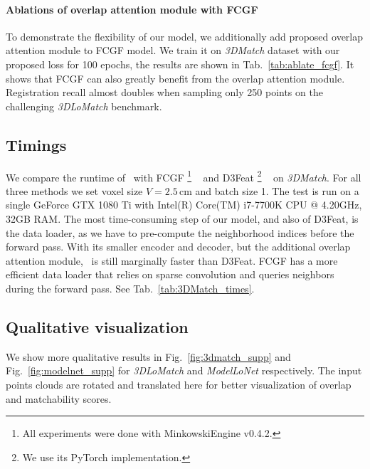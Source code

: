 
\paragraph{Ablations of overlap attention module with FCGF}
To demonstrate the flexibility of our model, we additionally add proposed overlap attention module to FCGF model. We train it on \emph{3DMatch} dataset with our proposed loss for 100 epochs, the results are shown in Tab.~\ref{tab:ablate_fcgf}. It shows that FCGF can also greatly beneﬁt from the overlap attention module. Registration recall almost doubles when sampling only 250 points on the challenging \emph{3DLoMatch} benchmark. 


\subsection{Timings}
\label{sec:timing}

We compare the runtime of \acro\ with FCGF%
\footnote{All experiments were done with MinkowskiEngine v0.4.2.} %
~\cite{Choy2019FCGF} and D3Feat%
\footnote{We use its PyTorch implementation.} %
~\cite{bai2020d3feat} on \emph{3DMatch}. For all three methods we set voxel size $V\!=\!2.5\,$cm and batch size 1. The test is run on a single GeForce GTX 1080 Ti with Intel(R) Core(TM) i7-7700K CPU @ 4.20GHz, 32GB RAM. The most time-consuming step of our model, and also of D3Feat, is the data loader, as we have to pre-compute the neighborhood indices before the forward pass. With its smaller encoder and decoder, but the additional overlap attention module, \acro\ is still marginally faster than D3Feat. FCGF has a more efficient data loader that relies on sparse convolution and queries neighbors during the forward pass. See Tab.~\ref{tab:3DMatch_times}.

\subsection{Qualitative visualization}
\label{sec:qualitative_supp}
We show more qualitative results in Fig.~\ref{fig:3dmatch_supp} and Fig.~\ref{fig:modelnet_supp} for \emph{3DLoMatch} and \emph{ModelLoNet} respectively. The input points clouds are rotated and translated here for better visualization of overlap and matchability scores. 







